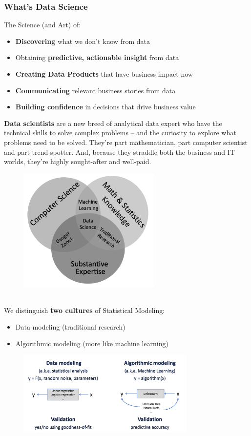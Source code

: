 \documentclass[10pt,a4paper]{article}
\begin{document}
\subsubsection{What's Data Science}
The Science (and Art) of:
\begin{itemize}
	\item \textbf{Discovering} what we don’t know from data
	\item Obtaining \textbf{predictive, actionable insight} from data
	\item \textbf{Creating Data Products} that have business impact now
	\item \textbf{Communicating} relevant business stories from data
	\item \textbf{Building confidence} in decisions that drive business value
\end{itemize}
\textbf{Data scientists} are a new breed of analytical data expert who have the technical skills to solve complex problems – and the curiosity to explore what problems need to be solved. They’re part mathematician, part computer scientist and part trend-spotter. And, because they straddle both the business and IT worlds, they’re highly sought-after and well-paid.
\begin{figure}[h!]
 \hfill \includegraphics[width=200pt]{images/data-scientist.png}\hspace*{\fill}
  \label{fig:data-scientists}
\end{figure} \\
We distinguish \textbf{two cultures} of Statistical Modeling:
\begin{itemize}
	\item Data modeling (traditional research)
	\item Algorithmic modeling (more like machine learning)
\end{itemize}
\begin{figure}[h!]
 \hfill \includegraphics[width=250pt]{images/statistical-modeling.png}\hspace*{\fill}
  \label{fig:statistical-modeling}
\end{figure}
\end{document}
